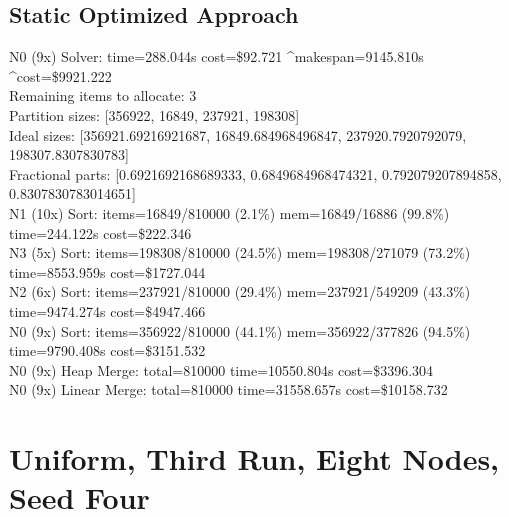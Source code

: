 \documentclass[]{interact}
\theoremstyle{plain}
\theoremstyle{definition}
\theoremstyle{remark}
\begin{document}
\subsection{Static Optimized Approach}
N0 (9x) Solver: time=288.044\textmu s cost=\$92.721 \^{}makespan=9145.810\textmu s \^{}cost=\$9921.222\\
Remaining items to allocate: 3\\
Partition sizes: [356922, 16849, 237921, 198308]\\
Ideal sizes: [356921.69216921687, 16849.684968496847, 237920.7920792079, 198307.8307830783]\\
Fractional parts: [0.6921692168689333, 0.6849684968474321, 0.792079207894858, 0.8307830783014651]\\
N1 (10x) Sort: items=16849/810000 (2.1\%) mem=16849/16886 (99.8\%) time=244.122\textmu s cost=\$222.346\\
N3 (5x) Sort: items=198308/810000 (24.5\%) mem=198308/271079 (73.2\%) time=8553.959\textmu s cost=\$1727.044\\
N2 (6x) Sort: items=237921/810000 (29.4\%) mem=237921/549209 (43.3\%) time=9474.274\textmu s cost=\$4947.466\\
N0 (9x) Sort: items=356922/810000 (44.1\%) mem=356922/377826 (94.5\%) time=9790.408\textmu s cost=\$3151.532\\
N0 (9x) Heap Merge: total=810000 time=10550.804\textmu s cost=\$3396.304\\
N0 (9x) Linear Merge: total=810000 time=31558.657\textmu s cost=\$10158.732

\clearpage

\section{Uniform, Third Run, Eight Nodes, Seed Four}
\end{document}
